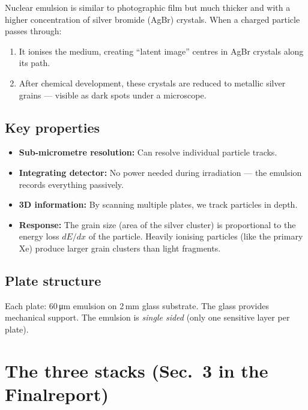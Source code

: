 \documentclass[12pt,a4paper]{article}
\begin{document}
Nuclear emulsion is similar to photographic film but much thicker and
with a higher concentration of silver bromide (AgBr) crystals. When a
charged particle passes through:
\begin{enumerate}
  \item It ionises the medium, creating ``latent image'' centres in
        AgBr crystals along its path.
  \item After chemical development, these crystals are reduced to
        metallic silver grains --- visible as dark spots under a
        microscope.
\end{enumerate}

\subsection{Key properties}

\begin{itemize}
  \item \textbf{Sub-micrometre resolution:} Can resolve individual
        particle tracks.
  \item \textbf{Integrating detector:} No power needed during
        irradiation --- the emulsion records everything passively.
  \item \textbf{3D information:} By scanning multiple plates, we
        track particles in depth.
  \item \textbf{Response:} The grain size (area of the silver cluster)
        is proportional to the energy loss $dE/dx$ of the particle.
        Heavily ionising particles (like the primary Xe) produce
        larger grain clusters than light fragments.
\end{itemize}

\subsection{Plate structure}

Each plate: 60\,\si{\micro\meter} emulsion on 2\,mm glass substrate.
The glass provides mechanical support. The emulsion is \emph{single
sided} (only one sensitive layer per plate).

\section{The three stacks (Sec.~3 in the Finalreport)}
\end{document}
